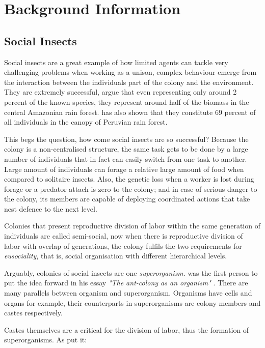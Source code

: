 \chapter{Background Information}
\label{ch:background-information}

\section {Social Insects}

Social insects are a great example of how limited agents can tackle very challenging problems when working as a unison, complex behaviour emerge from the interaction between the individuals part of the colony and the environment. They are extremely successful, \citeauthor{Fittkau1973} argue that even representing only around 2 percent of the known species, they represent around half of the biomass in the central Amazonian rain forest. \citeauthor{erwin1989} has also shown that they constitute 69 percent of all individuals in the canopy of Peruvian rain forest.

This begs the question, how come social insects are so successful? Because the colony is a non-centralised structure, the same task gets to be done by a large number of individuals that in fact can easily switch from one task to another. Large amount of individuals can forage a relative large amount of food when compared to solitaire insects. Also, the genetic loss when a worker is lost during forage or a predator attach is zero to the colony; and in case of serious danger to the colony, its members are capable of deploying coordinated actions that take nest defence to the next level.

Colonies that present reproductive division of labor within the same generation of individuals are called semi-social, now when there is reproductive division of labor with overlap of generations, the colony fulfils the two requirements for \emph{eusociality}, that is, social organisation with different hierarchical levels.   

Arguably, colonies of social insects are one \emph{superorganism}. \citeauthor{JMOR:JMOR1050220206} was the first person to put the idea forward in his essay \emph{"The ant-colony as an organism"} \cite{JMOR:JMOR1050220206}. There are many parallels between organism and superorganism. Organisms have cells and organs for example, their counterparts in superorganisms are colony members and castes respectively. 

Castes themselves are a critical for the division of labor, thus the formation of superorganisms. As \citeauthor{citeulike:3731267} put it:

